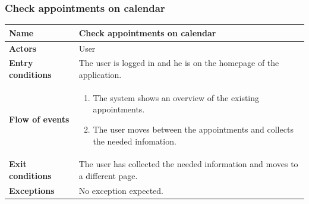 \subsubsection{Check appointments on calendar}
\begin{table}[!h]
	\centering
	{\renewcommand{\arraystretch}{2}%
		\begin{tabular}{|l|p{12cm}|}
			\hline
			\textbf{Name} 				& \textbf{Check appointments on calendar} \\ \hline
			\textbf{Actors} 			& User \\ \hline
			\textbf{Entry conditions} 	& The user is logged in and he is on the homepage of the application. \\ \hline
			\textbf{Flow of events}		& \begin{minipage}[t]{0.75\textwidth}
				\begin{enumerate}
					\item The system shows an overview of the existing appointments.
					\item The user moves between the appointments and collects the needed infomation.
				\end{enumerate}
			\end{minipage}	\\ \hline
			\textbf{Exit conditions}	& The user has collected the needed information and moves to a different page.  \\ \hline
			\textbf{Exceptions}			& No exception expected.  \\ \hline
	\end{tabular}}
\end{table}
\clearpage

